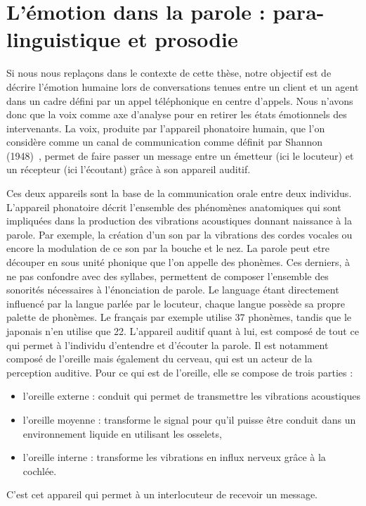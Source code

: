\section{L'émotion dans la parole : para-linguistique et prosodie}
Si nous nous replaçons dans le contexte de cette thèse, notre objectif est de décrire l'émotion humaine lors de conversations tenues entre un client et un agent dans un cadre défini par un appel téléphonique en centre d'appels. Nous n'avons donc que la voix comme axe d'analyse pour en retirer les états émotionnels des intervenants.
La voix, produite par l'appareil phonatoire humain, que l'on considère comme un canal de communication comme définit par Shannon (1948)~\cite{Shannon1948}, permet de faire passer un message entre un émetteur (ici le locuteur) et un récepteur (ici l'écoutant) grâce à son appareil auditif.

Ces deux appareils sont la base de la communication orale entre deux individus. L'appareil phonatoire décrit l'ensemble des phénomènes anatomiques qui sont impliquées dans la production des vibrations acoustiques donnant naissance à la parole. Par exemple, la création d'un son par la vibrations des cordes vocales ou encore la modulation de ce son par la bouche et le nez. La parole peut etre découper en sous unité phonique que l'on appelle des phonèmes. Ces derniers, à ne pas confondre avec des syllabes, permettent de composer l'ensemble des sonorités nécessaires à l'énonciation de parole.
Le language étant directement influencé par la langue parlée par le locuteur, chaque langue possède sa propre palette de phonèmes. Le français par exemple utilise 37 phonèmes, tandis que le japonais n'en utilise que 22.
L'appareil auditif quant à lui, est composé de tout ce qui permet à l'individu d'entendre et d'écouter la parole. Il est notamment composé de l'oreille mais également du cerveau, qui est un acteur de la perception auditive. Pour ce qui est de l'oreille, elle se compose de trois parties :
\begin{itemize}
  \item l'oreille externe : conduit qui permet de transmettre les vibrations acoustiques
  \item l'oreille moyenne : transforme le signal pour qu'il puisse être conduit dans un environnement liquide en utilisant les osselets,
  \item l'oreille interne : transforme les vibrations en influx nerveux grâce à la cochlée.
\end{itemize}
C'est cet appareil qui permet à un interlocuteur de recevoir un message.

